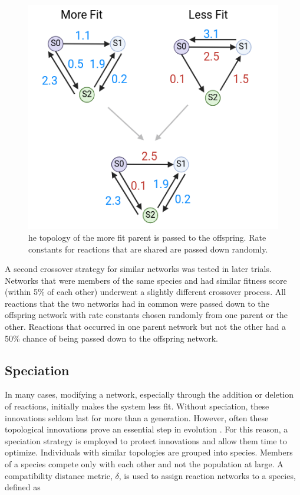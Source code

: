 \documentclass[12pt]{report}
\begin{document}
\begin{figure}
	\centering
    \includegraphics[width=12cm]{images/crossover_example.png}
    \caption[Crossover example]{he topology of the more fit parent is passed to the offspring. Rate constants for reactions that are shared are passed down randomly.}
    \label{figure:crossover_example}
\end{figure}


A second crossover strategy for similar networks was tested in later trials. Networks that were members of the same species and had similar fitness score (within 5\% of each other) underwent a slightly different crossover process. All reactions that the two networks had in common were passed down to the offspring network with rate constants chosen randomly from one parent or the other. Reactions that occurred in one parent network but not the other had a 50\% chance of being passed down to the offspring network.

\subsection{Speciation}
In many cases, modifying a network, especially through the addition or deletion of reactions, initially makes the system less fit. Without speciation, these innovations seldom last for more than a generation. However, often these topological innovations prove an essential step in evolution \cite{stanley_evolving_2002}. For this reason, a speciation strategy is employed to protect innovations and allow them time to optimize. Individuals with similar topologies are grouped into species. Members of a species compete only with each other and not the population at large.  A compatibility distance metric, $\delta$, is used to assign reaction networks to a species, defined as
\end{document}
